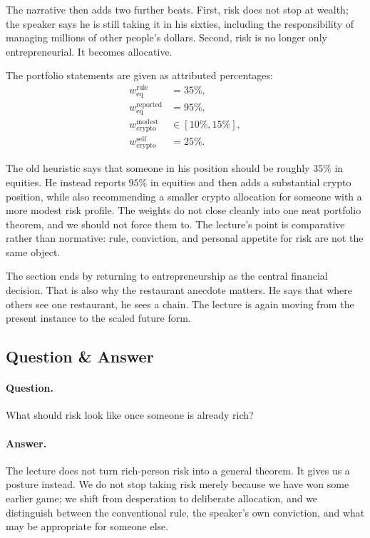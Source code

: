 The narrative then adds two further beats. First, risk does not stop at wealth; the speaker says he is still taking it in his sixties, including the responsibility of managing millions of other people's dollars. Second, risk is no longer only entrepreneurial. It becomes allocative.

The portfolio statements are given as attributed percentages:
\begin{align}
w_{\mathrm{eq}}^{\mathrm{rule}} &= 35\%,\\
w_{\mathrm{eq}}^{\mathrm{reported}} &= 95\%,\\
w_{\mathrm{crypto}}^{\mathrm{modest}} &\in [10\%,15\%],\\
w_{\mathrm{crypto}}^{\mathrm{self}} &= 25\%.
\end{align}

The old heuristic says that someone in his position should be roughly \(35\%\) in equities. He instead reports \(95\%\) in equities and then adds a substantial crypto position, while also recommending a smaller crypto allocation for someone with a more modest risk profile. The weights do not close cleanly into one neat portfolio theorem, and we should not force them to. The lecture's point is comparative rather than normative: rule, conviction, and personal appetite for risk are not the same object.

The section ends by returning to entrepreneurship as the central financial decision. That is also why the restaurant anecdote matters. He says that where others see one restaurant, he sees a chain. The lecture is again moving from the present instance to the scaled future form.

\subsection{Question \& Answer}

\paragraph{Question.} What should risk look like once someone is already rich?

\paragraph{Answer.} The lecture does not turn rich-person risk into a general theorem. It gives us a posture instead. We do not stop taking risk merely because we have won some earlier game; we shift from desperation to deliberate allocation, and we distinguish between the conventional rule, the speaker's own conviction, and what may be appropriate for someone else.

